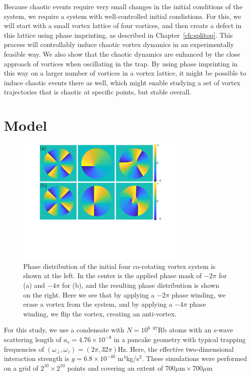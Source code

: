 Because chaotic events require very small changes in the initial conditions of the system, we require a system with well-controlled initial condistions.
For this, we will start with a small vortex lattice of four vortices, and then create a defect in this lattice using phase imprinting, as described in Chapter~\ref{ch:splitop}.
This process will controllably induce chaotic vortex dynamics in an experimentally feasible way.
We also show that the chaotic dynamics are enhanced by the close approach of vortices when oscillating in the trap.
By using phase imprinting in this way on a larger number of vortices in a vortex lattice, it might be possible to induce chaotic events there as well, which might enable studying a set of vortex trajectories that is chaotic at specific points, but stable overall.

\section{Model}

\begin{figure}
\center \includegraphics[width=0.75\textwidth]{data/2d/phase/phase}

\caption{
Phase distribution of the initial four co-rotating vortex system is shown at the left.
In the center is the applied phase mask of $-2\pi$ for (a) and $-4\pi$ for (b), and the resulting phase distribution is shown on the right.
Here we see that by applying a $-2\pi$ phase winding, we erase a vortex from the system, and by applying a $-4\pi$ phase winding, we flip the vortex, creating an anti-vortex.
}
\label{fig:phase}
\end{figure}


For this study, we use a condensate with $N = 10^6$ $^{87}$Rb atoms with an s-wave scattering length of $a_s=4.76\times 10^{-9}$ in a pancake geometry with typical trapping frequencies of $(\omega_\perp, \omega_z) = (2\pi, 32\pi)$Hz.
Here, the effective two-dimensional interaction strength is $g = 6.8\times 10^{-40}$ m$^4$kg/s$^2$.
These simulations were performed on a grid of $2^{10} \times 2^{10}$ points and covering an extent of $700\mu \text{m} \times 700 \mu \text{m}$

